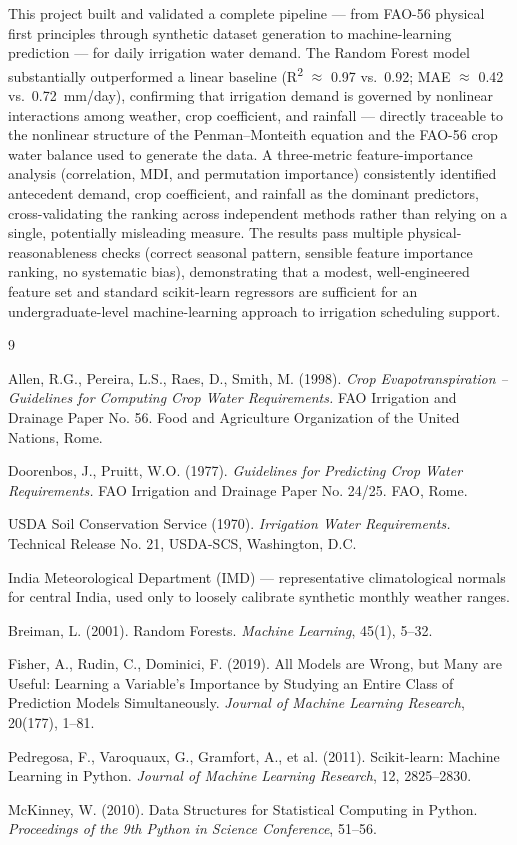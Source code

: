 \documentclass[11pt,a4paper]{article}
\begin{document}
This project built and validated a complete pipeline --- from FAO-56 physical
first principles through synthetic dataset generation to machine-learning
prediction --- for daily irrigation water demand. The Random Forest model
substantially outperformed a linear baseline
(R\textsuperscript{2} $\approx$ 0.97 vs.\ 0.92; MAE $\approx$ 0.42 vs.\
0.72~mm/day), confirming that irrigation demand is governed by nonlinear
interactions among weather, crop coefficient, and rainfall --- directly
traceable to the nonlinear structure of the Penman--Monteith equation and the
FAO-56 crop water balance used to generate the data. A three-metric
feature-importance analysis (correlation, MDI, and permutation importance)
consistently identified antecedent demand, crop coefficient, and rainfall as
the dominant predictors, cross-validating the ranking across independent
methods rather than relying on a single, potentially misleading measure. The
results pass multiple physical-reasonableness checks (correct seasonal
pattern, sensible feature importance ranking, no systematic bias),
demonstrating that a modest, well-engineered feature set and standard
scikit-learn regressors are sufficient for an undergraduate-level
machine-learning approach to irrigation scheduling support.

\begin{thebibliography}{9}

Allen, R.G., Pereira, L.S., Raes, D., Smith, M. (1998).
\textit{Crop Evapotranspiration -- Guidelines for Computing Crop Water
Requirements.} FAO Irrigation and Drainage Paper No. 56. Food and Agriculture
Organization of the United Nations, Rome.

Doorenbos, J., Pruitt, W.O. (1977).
\textit{Guidelines for Predicting Crop Water Requirements.}
FAO Irrigation and Drainage Paper No. 24/25. FAO, Rome.

USDA Soil Conservation Service (1970).
\textit{Irrigation Water Requirements.}
Technical Release No. 21, USDA-SCS, Washington, D.C.

India Meteorological Department (IMD) --- representative climatological
normals for central India, used only to loosely calibrate synthetic monthly
weather ranges.

Breiman, L. (2001).
Random Forests.
\textit{Machine Learning}, 45(1), 5--32.

Fisher, A., Rudin, C., Dominici, F. (2019).
All Models are Wrong, but Many are Useful: Learning a Variable's Importance
by Studying an Entire Class of Prediction Models Simultaneously.
\textit{Journal of Machine Learning Research}, 20(177), 1--81.

Pedregosa, F., Varoquaux, G., Gramfort, A., et al. (2011).
Scikit-learn: Machine Learning in Python.
\textit{Journal of Machine Learning Research}, 12, 2825--2830.

McKinney, W. (2010).
Data Structures for Statistical Computing in Python.
\textit{Proceedings of the 9th Python in Science Conference}, 51--56.

\end{thebibliography}
\end{document}
